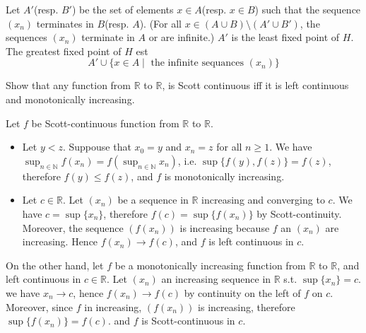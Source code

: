 \documentclass[a4paper,11pt]{exam}
\newcommand{\N}{\mathbb{N}}
\newcommand{\R}{\mathbb{R}}
\begin{document}
\begin{questions}
\begin{solution}
			Let $A'$(resp.  $B'$) be the set of elements $x\in A$(resp.  $x\in B$) such that the sequence $(x_n)$ terminates in $B$(resp.  $A$). 
			(For all $x \in (A \cup B) \setminus (A' \cup B')$, the sequences $(x_n)$
			terminate in $A$ or are infinite.)
			$A'$ is the least fixed point of $H$.
			The greatest fixed point of $H$ est
			\[
			A' \cup \{ x \in A \mid \text{ the
				infinite sequances $(x_n)$}  \}
			\]
		\end{solution}
		
		
		\question
		Show that any function from $\R$ to $\R$, is Scott continuous iff it is left continuous and monotonically increasing.
		\begin{solution}
			Let $f$ be Scott-continuous function from $\R$ to $\R$.
			\begin{itemize}
				\item Let $y<z$. Suppouse that $x_0=y$ and $x_n=z$ for all $n \geq  1$.
				We have $\sup_{n \in \N}f(x_n) = f(\sup_{n \in\N}x_n)$, i.e. $\sup\{f(y),f(z)\} = f(z)$, therefore $f(y) \leq f(z)$, and	$f$ is monotonically increasing.
				\item Let $c\in\R$. Let $(x_n)$ be a sequence in $\R$ increasing and converging to $c$.
				We have $c = \sup \{ x_n \}$, therefore $f(c) = \sup \{ f(x_n) \}$ by Scott-continuity.
				Moreover, the sequence $(f(x_n))$ is increasing because $f$ an $(x_n)$ are increasing. 
				Hence $f(x_n) \rightarrow f(c)$, and $f$ is left continuous in $c$.
			\end{itemize}
			
			On the other hand, let $f$ be a monotonically increasing function from $\R$ to $\R$, and left continuous in $c\in\R$.
			Let $(x_n)$ an increasing sequence in  $\R$ s.t. $\sup \{ x_n \} = c$.
			we have $x_n \rightarrow c$, hence $f(x_n) \rightarrow f(c)$ by continuity on the left of $f$ on $c$.
			Moreover, since $f$ in increasing, $(f(x_n))$ is increasing, therefore $\sup \{ f(x_n) \} = f(c)$.
			and $f$ is Scott-continuous in $c$.
		\end{solution}
		

\end{questions}
\end{document}
